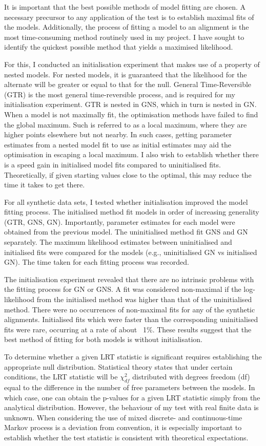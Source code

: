 It is important that the best possible methods of model fitting are chosen. A necessary precursor to any application of the test is to establish maximal fits of the models. Additionally, the process of fitting a model to an alignment is the most time-consuming method routinely used in my project. I have sought to identify the quickest possible method that yields a maximised likelihood. 

For this, I conducted an initialisation experiment that makes use of a property of nested models. For nested models, it is guaranteed that the likelihood for the alternate will be greater or equal to that for the null. General Time-Reversible (GTR) is the most general time-reversible process, and is required for my initialisation experiment. GTR is nested in GNS, which in turn is nested in GN. When a model is not maximally fit, the optimisation methods have failed to find the global maximum. Such is referred to as a local maximum, where they are higher points elsewhere but not nearby. In such cases, getting parameter estimates from a nested model fit to use as initial estimates may aid the optimisation in escaping a local maximum. I also wish to establish whether there is a speed gain in initialised model fits compared to uninitialised fits. Theoretically, if given starting values close to the optimal, this may reduce the time it takes to get there. 

For all synthetic data sets, I tested whether initialisation improved the model fitting process. The initialised method fit models in order of increasing generality (GTR, GNS, GN). Importantly, parameter estimates for each model were obtained from the previous model. The uninitialised method fit GNS and GN separately. The maximum likelihood estimates between uninitialised and initialised fits were compared for the models (e.g., uninitialised GN vs initialised GN). The time taken for each fitting process was recorded.  

The initialisation experiment revealed that there are no intrinsic problems with the fitting process for GN or GNS. A fit was considered non-maximal if the log-likelihood from the initialised method was higher than that of the uninitialised method. There were no occurrences of non-maximal fits for any of the synthetic alignments. Initialised fits which were faster than the corresponding uninitialised fits were rare, occurring at a rate of about ~1\%. These results suggest that the best method of fitting for both models is without initialisation.

To determine whether a given LRT statistic is significant requires establishing the appropriate null distribution. Statistical theory states that under certain conditions, the LRT statistic will be $\chi^2_{df}$ distributed with degrees freedom (df) equal to the difference in the number of free parameters between the models. In which case, one can obtain the p-values for a given LRT statistic simply from the analytical distribution. However, the behaviour of my test with real finite data is unknown. When considering the use of mixed discrete- and continuous-time Markov process is a deviation from convention, it is especially important to establish whether the test statistic is consistent with theoretical expectations. 


